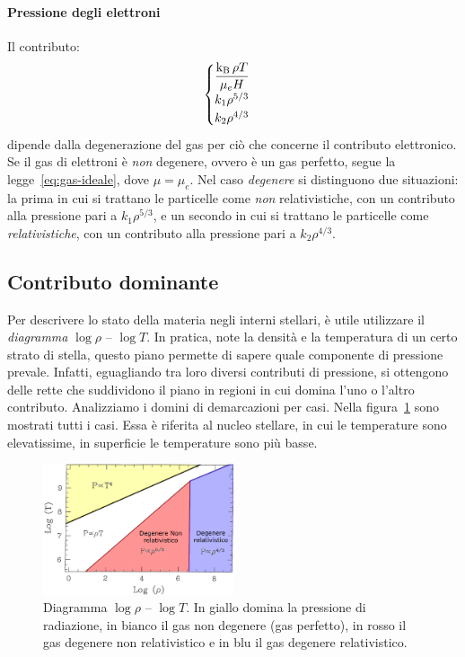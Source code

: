 \paragraph{Pressione degli elettroni}
Il contributo:
\[
\begin{cases} 
    \dfrac{\operatorname{k_B} \rho T}{\mu_e H} \\ 
    k_1 \rho^{5/3} \\ 
    k_2 \rho^{4/3}
    \end{cases}
\]
dipende dalla degenerazione del gas per ciò che concerne il contributo elettronico. Se il gas di elettroni è \emph{non} degenere, ovvero è un gas perfetto, segue la legge~\eqref{eq:gas-ideale}, dove $\mu = \mu_e$. Nel caso \emph{degenere} si distinguono due situazioni: la prima in cui si trattano le particelle come \emph{non} relativistiche, con un contributo alla pressione pari a $k_1 \rho^{5/3}$, e un secondo in cui si trattano le particelle come \emph{relativistiche}, con un contributo alla pressione pari a $k_2 \rho^{4/3}$.

\subsection{Contributo dominante}
Per descrivere lo stato della materia negli interni stellari, è utile utilizzare il \emph{diagramma} $\log \rho$ -- $\log T$. In pratica, note la densità e la temperatura di un certo strato di stella, questo piano permette di sapere quale componente di pressione prevale. Infatti, eguagliando tra loro diversi contributi di pressione, si ottengono delle rette che suddividono il piano in regioni in cui domina l'uno o l'altro contributo. Analizziamo i domini di demarcazioni per casi. Nella figura~\ref{fig:diagramma-logrho-logt} sono mostrati tutti i casi. Essa è riferita al nucleo stellare, in cui le temperature sono elevatissime, in superficie le temperature sono più basse.

\begin{figure}
\centering
\includegraphics[width=0.5\textwidth]{immagini/piano-log-log.png}
\caption{Diagramma $\log \rho$ -- $\log T$. In giallo domina la pressione di radiazione, in bianco il gas non degenere (gas perfetto), in rosso il gas degenere non relativistico e in blu il gas degenere relativistico.}
\label{fig:diagramma-logrho-logt}
\end{figure}

